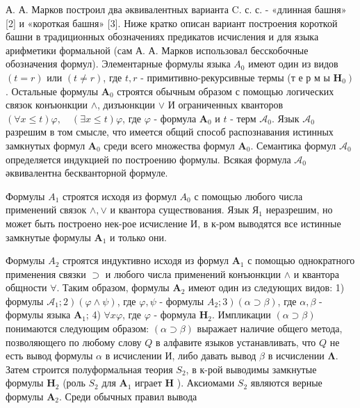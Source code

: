 \documentclass[10pt]{article}
\begin{document}
А. А. Марков построил два әквивалентных варианта C. с. с. - «длинная башня» [2] и «короткая башня» [3]. Ниже кратко описан вариант построения короткой башни в традиционных обозначениях предикатов исчисления и для языка арифметики формальной (сам А. А. Марков использовал бесскобочные обозначения формул). Элементарные формулы языка $A_{0}$ имеют один из видов $(t=r)$ или $(t \neq r)$, где $t, r$ - примитивно-рекурсивные термы (т е р м ы $\left.\boldsymbol{H}_{0}\right)$. Остальные формулы $\boldsymbol{A}_{0}$ строятся обычным образом с помощью логических связок конъюнкции $\wedge$, дизъюнкции $\vee$ И ограниченных кванторов $(\forall x \leqslant t) \varphi, \quad(\exists x \leqslant t) \varphi$, где $\varphi$ - формула $\boldsymbol{A}_{0}$ и $t$ - терм $\mathscr{A}_{0}$. Язык $\mathscr{A}_{0}$ разрешим в том смысле, что имеется общий способ распознавания истинных замкнутых формул $\boldsymbol{A}_{0}$ среди всего множества формул $\boldsymbol{A}_{0}$. Семантика формул $\mathcal{A}_{0}$ определяется индукцией по построению формулы. Всякая формула $\mathscr{A}_{0}$ әквивалентна бескванторной формуле.



Формулы $A_{1}$ строятся исходя из формул $A_{0}$ с помощью любого числа применений связок $\wedge, \vee$ и квантора существования. Язык $Я_{1}$ неразрешим, но может быть построено нек-рое исчисление $И$, в к-ром выводятся все истинные замкнутые формулы $\boldsymbol{A}_{1}$ и только они.



Формулы $A_{2}$ строятся индуктивно исходя из формул $\boldsymbol{A}_{1}$ с помощью однократного применения связки $\supset$ и любого числа применений конъюнкции $\wedge$ и квантора общности $\forall$. Таким образом, формулы $\boldsymbol{A}_{2}$ имеют один из следующих видов: 1) формулы $\left.\mathcal{A}_{1} ; 2\right)(\varphi \wedge \psi)$, где $\varphi, \psi$ - формулы $\left.A_{2} ; 3\right)(\alpha \supset \beta)$, где $\alpha, \beta$ - формулы языка $\boldsymbol{A}_{1}$; 4) $\forall x \varphi$, где $\varphi$ - формула $\boldsymbol{H}_{2}$. Импликации $(\alpha \supset \beta)$ понимаются следующим образом: $(\alpha \supset \beta)$ выражает наличие общего метода, позволяющего по любому слову $Q$ в алфавите языков устанавливать, что $Q$ не есть вывод формулы $\alpha$ в исчислении $И$, либо давать вывод $\beta$ в исчислении $\boldsymbol{\Lambda}$. Затем строится полуформальная теория $S_{2}$, в к-рой выводимы замкнутые формулы $\boldsymbol{H}_{2}$ (роль $S_{2}$ для $\boldsymbol{A}_{1}$ играет $\boldsymbol{H}$ ). Аксиомами $S_{2}$ являются верные формулы $\boldsymbol{A}_{2}$. Среди обычных правил вывода
\end{document}
